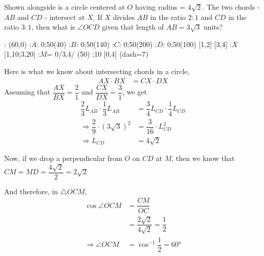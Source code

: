 

\question[6]  Shown alongside is a circle centered at $O$ having radius = $4\sqrt2$.
The two chords - $AB$ and $CD$ - intersect at $X$. If $X$ divides $AB$ in the ratio $2:1$
and $CD$ in the ratio $3:1$, then what is $\angle OCD$ given that length of $AB = 3\sqrt3$ units?


\begin{marginfigure}
    : (60,0)
    :$A$: 0;50(40)
    :$B$: 0;50(140)
    :$C$: 0;50(200)
    :$D$: 0;50(100)
     [1,2]
     [3,4]
    :$X$[1,10;3,20]
    :$M$= 0/3,4/
	\figdrawbegin{}
		(50)
    \figdrawline [1,2]
    \figdrawline [3,4]
    ;10 [0,4]
    \figset (dash=7)
    \figdrawline [0,3]
    \ifprintanswers
      \figdrawline [0,6]
    \fi
	\figdrawend
  \centerline{\box\figBoxA}
\end{marginfigure}

\ifprintanswers
\fi 

\begin{solution}[\fullpage]
	Here is what we know about intersecting chords in a circle,
	\begin{align}
		AX\cdot BX &= CX\cdot DX
	\end{align}
	Assuming that $\dfrac{AX}{BX} = \dfrac{2}{1}$ and $\dfrac{CX}{DX} = \dfrac{3}{1}$, we get
	\begin{align}
		\dfrac{2}{3}L_{AB}\cdot\dfrac{1}{3}L_{AB} &= \dfrac{3}{4}L_{CD}\cdot\dfrac{1}{4}L_{CD} \\
		\Rightarrow \dfrac{2}{9}\cdot(3\sqrt{3})^2 &= \dfrac{3}{16}\cdot L_{CD}^2 \\
		\Rightarrow L_{CD} &= 4\sqrt{2}
	\end{align}
	
	Now, if we drop a perpendicular from $O$ on $CD$ at $M$, then we know that 
	$CM = MD = \dfrac{4\sqrt2}{2} = 2\sqrt{2}$
	
	And therefore, in $\triangle OCM$, 
	\begin{align}
		\cos\angle OCM &= \dfrac{CM}{OC} \\
		               &= \dfrac{2\sqrt{2}}{4\sqrt{2}} = \dfrac{1}{2} \\
		\Rightarrow \angle OCM &= \cos^{-1}\dfrac{1}{2} = \ang{60}
	\end{align}
\end{solution}
